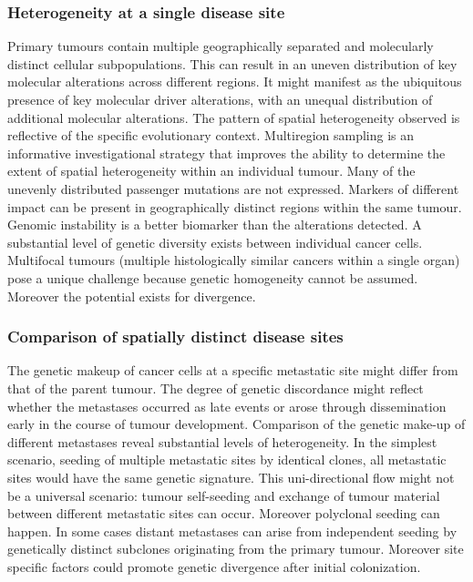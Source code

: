 		\subsubsection{Heterogeneity at a single disease site}
		Primary tumours contain multiple geographically separated and molecularly distinct cellular subpopulations.
		This can result in an uneven distribution of key molecular alterations across different regions.
		It might manifest as the ubiquitous presence of key molecular driver alterations, with an unequal distribution of additional molecular alterations.
		The pattern of spatial heterogeneity observed is reflective of the specific evolutionary context.
		Multiregion sampling is an informative investigational strategy that improves the ability to determine the extent of spatial heterogeneity within an individual tumour.
		Many of the unevenly distributed passenger mutations are not expressed.
		Markers of different impact can be present in geographically distinct regions within the same tumour.
		Genomic instability is a better biomarker than the alterations detected.
		A substantial level of genetic diversity exists between individual cancer cells.
		Multifocal tumours (multiple histologically similar cancers within a single organ) pose a unique challenge because genetic homogeneity cannot be assumed.
		Moreover the potential exists for divergence.

		\subsubsection{Comparison of spatially distinct disease sites}
		The genetic makeup of cancer cells at a specific metastatic site might differ from that of the parent tumour.
		The degree of genetic discordance might reflect whether the metastases occurred as late events or arose through dissemination early in the course of tumour development.
		Comparison of the genetic make-up of different metastases reveal substantial levels of heterogeneity.
		In the simplest scenario, seeding of multiple metastatic sites by identical clones, all metastatic sites would have the same genetic signature.
		This uni-directional flow might not be a universal scenario: tumour self-seeding and exchange of tumour material between different metastatic sites can occur.
		Moreover polyclonal seeding can happen.
		In some cases distant metastases can arise from independent seeding by genetically distinct subclones originating from the primary tumour.
		Moreover site specific factors could promote genetic divergence after initial colonization.


